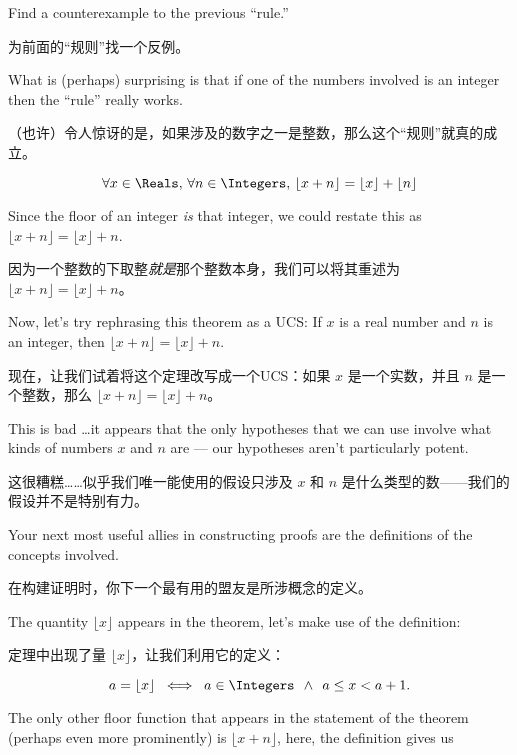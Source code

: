 \begin{exer}
      Find a counterexample to the previous ``rule.''

      为前面的“规则”找一个反例。
\end{exer}

What is (perhaps) surprising is that if one of the numbers involved is an
integer then the ``rule'' really works.

（也许）令人惊讶的是，如果涉及的数字之一是整数，那么这个“规则”就真的成立。

\begin{thm}
      \[ \forall x \in \Reals, \, \forall n \in \Integers, \,
            \lfloor x + n \rfloor = \lfloor x \rfloor + \lfloor n \rfloor \]
\end{thm}

Since the floor of an integer {\em is} that integer, we could restate this
as $ \lfloor x + n \rfloor = \lfloor x \rfloor +  n$.

因为一个整数的下取整{\em 就是}那个整数本身，我们可以将其重述为 $ \lfloor x + n \rfloor = \lfloor x \rfloor +  n$。

Now, let's try rephrasing this theorem as a UCS:  If $x$ is a real number
and $n$ is an integer, then $\lfloor x + n \rfloor = \lfloor x \rfloor +  n$.

现在，让我们试着将这个定理改写成一个UCS：如果 $x$ 是一个实数，并且 $n$ 是一个整数，那么 $\lfloor x + n \rfloor = \lfloor x \rfloor +  n$。

This is bad \ldots it appears that the only hypotheses that we can use
involve what kinds of numbers $x$ and $n$ are --- our hypotheses aren't
particularly potent.

这很糟糕……似乎我们唯一能使用的假设只涉及 $x$ 和 $n$ 是什么类型的数——我们的假设并不是特别有力。

Your next most useful allies in constructing proofs
are the definitions of the concepts involved.

在构建证明时，你下一个最有用的盟友是所涉概念的定义。

The quantity
$\lfloor x \rfloor$ appears in the theorem, let's make
use of the definition:

定理中出现了量 $\lfloor x \rfloor$，让我们利用它的定义：

\[ a = \lfloor x  \rfloor \; \iff \; a \in \Integers \; \,
      \land \; \, a \leq x < a+1.
\]

The only other floor function that appears in the statement of the theorem
(perhaps even more prominently)
is $\lfloor x + n\rfloor$, here, the definition gives us

